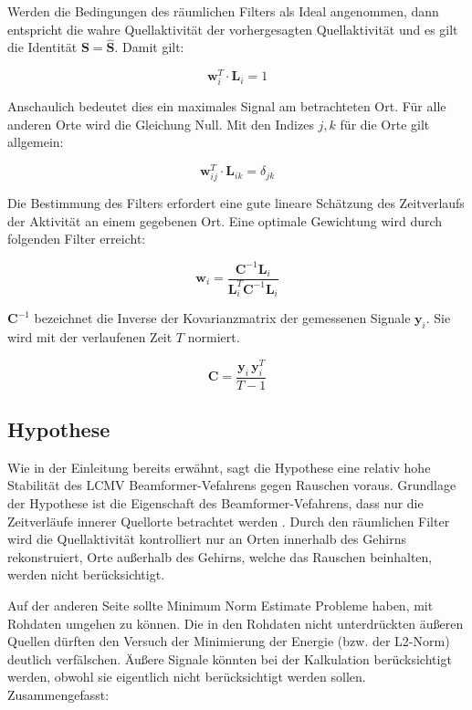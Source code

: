 \documentclass[doc,a4paper,12pt]{apa6}
\newcommand{\mx}[1]{\mathbf{#1}}
\begin{document}
Werden die Bedingungen des räumlichen Filters als Ideal angenommen, dann entspricht die wahre Quellaktivität der vorhergesagten Quellaktivität und es gilt die Identität $\mx{S} = \mx{\hat S}$. Damit gilt:

\begin{equation}
\mx{w}_i^T \cdot \mx{L}_i = 1
\end{equation}

Anschaulich bedeutet dies ein maximales Signal am betrachteten Ort. Für alle anderen Orte wird die Gleichung Null. Mit den Indizes $j,k$ für die Orte gilt allgemein:

\begin{equation}
\mx{w}^T_{ij} \cdot \mx{L}_{ik} = \delta_{jk}
\end{equation}

Die Bestimmung des Filters erfordert eine gute lineare Schätzung des Zeitverlaufs der Aktivität an einem gegebenen Ort. Eine optimale Gewichtung \parencite[z.B.][]{haykin2008adaptive} wird durch folgenden Filter erreicht:

\begin{equation}
\label{eq:beam-filter-w}
\mx{w}_i = \frac{\mx{C}^{-1} \mx{L}_i}{\mx{L}^T_i \mx{C}^{-1} \mx{L}_i}
\end{equation}

$\mx{C}^{-1}$ bezeichnet die Inverse der Kovarianzmatrix der gemessenen Signale $\mx{y}_i$. Sie wird mit der verlaufenen Zeit $T$ normiert.

\begin{equation}
\mx{C} = \frac{\mx{y}_i\,\mx{y}_i^T}{T-1}
\end{equation}

\subsection{Hypothese}
\label{sec:hypo}

Wie in der Einleitung bereits erwähnt, sagt die Hypothese eine relativ hohe Stabilität des LCMV Beamformer-Vefahrens gegen Rauschen voraus. Grundlage der Hypothese ist die Eigenschaft des Beamformer-Vefahrens, dass nur die Zeitverläufe innerer Quellorte betrachtet werden \parencite{van1997localization}. Durch den räumlichen Filter wird die Quellaktivität kontrolliert nur an Orten innerhalb des Gehirns rekonstruiert, Orte außerhalb des Gehirns, welche das Rauschen beinhalten, werden nicht berücksichtigt.

Auf der anderen Seite sollte Minimum Norm Estimate Probleme haben, mit Rohdaten umgehen zu können. Die in den Rohdaten nicht unterdrückten äußeren Quellen dürften den Versuch der Minimierung der Energie (bzw. der L2-Norm) deutlich verfälschen. Äußere Signale könnten bei der Kalkulation berücksichtigt werden, obwohl sie eigentlich nicht berücksichtigt werden sollen. Zusammengefasst:
\end{document}
